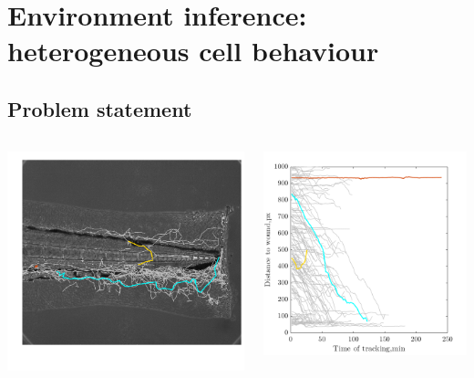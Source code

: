 \documentclass[mathserif,11pt]{beamer}
\begin{document}
\section{Environment inference: heterogeneous cell behaviour}
\subsection{Problem statement}
\begin{frame}
\begin{columns}
	\begin{column}{0.5\textwidth}
		\centering
		\includegraphics[scale=0.31]{Figures/example_tracks.png}
	\end{column}
	\begin{column}{0.5\textwidth}
		\centering
		\includegraphics[scale=0.34]{Figures/example_distances.png}

\end{column}
\end{columns}
\end{frame}
\end{document}
